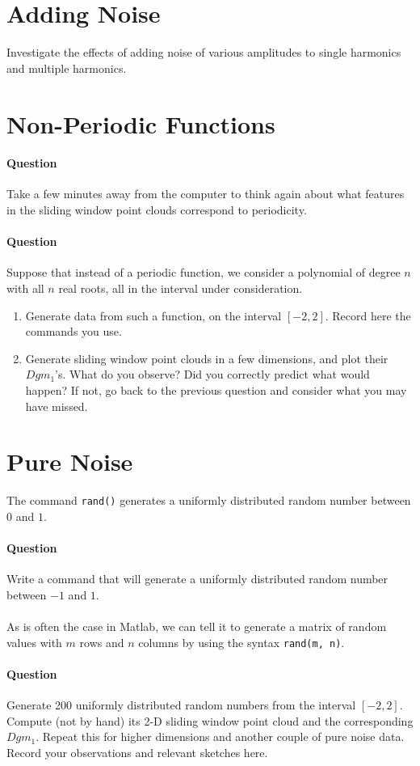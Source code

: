 \documentclass[12pt,twoside]{article}
\newcommand{\qn}{\paragraph*{Question}}
\begin{document}
\pagebreak

\section{Adding Noise}

Investigate the effects of adding noise of various amplitudes to single harmonics and multiple harmonics.\vfill


\pagebreak

\section{Non-Periodic Functions}

\qn Take a few minutes away from the computer to think again about what features in the sliding window point clouds correspond to periodicity.\vfill\vfill\vfill

\qn Suppose that instead of a periodic function, we consider a polynomial of degree $n$ with all $n$ real roots, all in the interval under consideration.
\begin{enumerate}
   \item Generate data from such a function, on the interval $[-2,2]$.  Record here the commands you use.\vfill
   \item Generate sliding window point clouds in a few dimensions, and plot their $Dgm_1$'s.  What do you observe?  Did you correctly predict what would happen?  If not, go back to the previous question and consider what you may have missed.\vfill\vfill\vfill\vfill\vfill
\end{enumerate}

\pagebreak

\section{Pure Noise}

The command \verb|rand()| generates a uniformly distributed random number between $0$ and $1$.

\qn Write a command that will generate a uniformly distributed random number between $-1$ and $1$.\\ \\

As is often the case in Matlab, we can tell it to generate a matrix of random values with $m$ rows and $n$ columns by using the syntax \verb|rand(m, n)|.

\qn Generate 200 uniformly distributed random numbers from the interval $[-2,2]$.  Compute (not by hand) its 2-D sliding window point cloud and the corresponding $Dgm_1$.  Repeat this for higher dimensions and another couple of pure noise data.  Record your observations and relevant sketches here.\vfill
\end{document}
